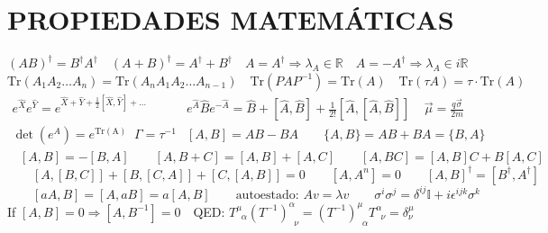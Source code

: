     \section{PROPIEDADES MATEMÁTICAS}
$(AB)^{\dagger} = B^\dagger A^\dagger\quad (A+B)^\dagger =A^\dagger +B^\dagger\quad A=A^\dagger \Rightarrow \lambda_A \in \mathbb{R}\quad  A=-A^\dagger \Rightarrow \lambda_A \in i\mathbb{R}$\\
$\text{Tr}(A_1 A_2 \dots A_n) = \text{Tr}(A_n A_1 A_2 \dots A_{n-1})\quad\text{Tr}(P A P^{-1}) = \text{Tr}(A)\quad \text{Tr}(\tau A)=\tau \cdot\text{Tr}(A) $\\
$
\begin{array}{ll}

e^{\hat{X}}e^{\hat{Y}} = e^{\hat{X}+\hat{Y} + \frac{1}{2}[\hat{X},\hat{Y}] + \dots} &e^{\hat{A}}\hat{B}e^{-\hat{A}} = \hat{B} + [\hat{A},\hat{B}] + \frac{1}{2!}[\hat{A},[\hat{A},\hat{B}]]\;\;\;\; \vec{\mu} = \frac{q \vec{\sigma}}{2m} \\[2pt]
    \det (e^A) =e^{\mathrm{Tr(A)}}\;\;\Gamma = \tau^{-1}&  [A,B]= AB-BA\qquad \{A,B\}=AB+BA=\{B,A\}
\end{array}
$\\
$\quad[A,B] = -[B,A]\qquad [A,B+C]=[A,B]+[A,C]\qquad[A,BC]= [A,B]C+B[A,C]$\\
$\qquad [A,[B,C]]+[B,[C,A]] + [C,[A,B]] =0\qquad [A,A^n] = 0\qquad [A,B]^\dagger= [B^\dagger,A^\dagger]$\\
$\qquad[a A, B] = [A,a B] = a [A,B]\qquad \text{autoestado: } Av = \lambda v\qquad \sigma^i \sigma^j = \delta^{ij}\mathbb{I} + i\epsilon^{ijk}\sigma^k$\\
\quad \quad \quad If $[A, B]= 0 \Rightarrow [A, B^{-1}] = 0 \quad $QED:\;\; $T^\mu_{\;\;\alpha} (T^{-1})^\alpha_{\;\;\nu} = (T^{-1})^\mu_{\;\;\alpha} T^\alpha_{\;\;\nu}= \delta^\mu_\nu\qquad $